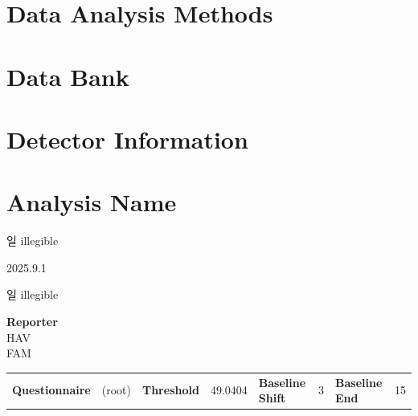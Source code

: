 \documentclass[UTF8,10pt,a4paper,fontset=fandol]{ctexart}
\newcommand{\handwritten}[1]{#1}
\begin{document}
\section{Data Analysis Methods}

\section{Data Bank}

\section{Detector Information}

\section{Analysis Name}

\handwritten{일 illegible}

\handwritten{2025.9.1}

\handwritten{일 illegible}

\newpage

\begin{center}
\textbf{Reporter}\\
HAV\\
FAM
\end{center}

\begin{center}
\begin{tabular}{@{}ll@{\qquad}ll@{\qquad}ll@{\qquad}ll@{}}
\textbf{Questionnaire} & (root) &
\textbf{Threshold} & 49.0404 &
\textbf{Baseline Shift} & 3 &
\textbf{Baseline End} & 15
\end{tabular}
\end{center}
\end{document}
